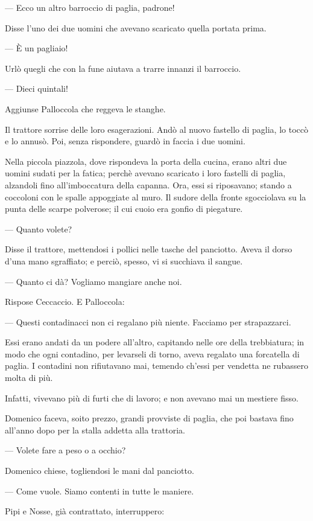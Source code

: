 — Ecco un altro barroccio di paglia, padrone!

Disse l’uno dei due uomini che avevano scaricato quella portata prima.

— È un pagliaio!

Urlò quegli che con la fune aiutava a trarre innanzi il barroccio.

— Dieci quintali!

Aggiunse Palloccola che reggeva le stanghe.

Il trattore sorrise delle loro esagerazioni. Andò al nuovo fastello di paglia, lo toccò e lo annusò. Poi, senza rispondere, guardò in faccia i due uomini.

Nella piccola piazzola, dove rispondeva la porta della cucina, erano altri due uomini sudati per la fatica; perchè avevano scaricato i loro fastelli di paglia, alzandoli fino all’imboccatura della capanna. Ora, essi si riposavano; stando a coccoloni con le spalle appoggiate al muro. Il sudore della fronte sgocciolava su la punta delle scarpe polverose; il cui cuoio era gonfio di piegature.

— Quanto volete?

Disse il trattore, mettendosi i pollici nelle tasche del panciotto. Aveva il dorso d’una mano sgraffiato; e perciò, spesso, vi si succhiava il sangue.

— Quanto ci dà? Vogliamo mangiare anche noi.

Rispose Ceccaccio. E Palloccola:

— Questi contadinacci non ci regalano più niente. Facciamo per strapazzarci.

Essi erano andati da un podere all’altro, capitando nelle ore della trebbiatura; in modo che ogni contadino, per levarseli di torno, aveva regalato una forcatella di paglia. I contadini non rifiutavano mai, temendo ch’essi per vendetta ne rubassero molta di più.

Infatti, vivevano più di furti che di lavoro; e non avevano mai un mestiere fisso.

Domenico faceva, soito prezzo, grandi provviste di paglia, che poi bastava fino all’anno dopo per la stalla addetta alla trattoria.

— Volete fare a peso o a occhio?

Domenico chiese, togliendosi le mani dal panciotto.

— Come vuole. Siamo contenti in tutte le maniere.

Pipi e Nosse, già contrattato, interruppero:

